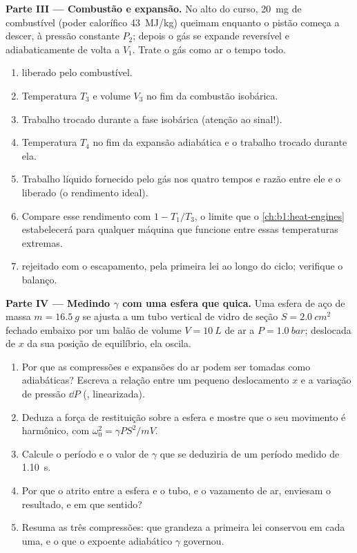 \begin{problem}
\medskip
\noindent\textbf{Parte III --- Combustão e expansão.}
No alto do curso, \qty{20}{mg} de combustível (poder calorífico
\qty{43}{MJ/kg}) queimam enquanto o pistão começa a descer, à pressão
constante $P_2$; depois o gás se expande reversível e adiabaticamente de
volta a $V_1$. Trate o gás como ar o tempo todo.
\begin{enumerate}[resume]
  \item {} liberado pelo combustível.
  \item Temperatura $T_3$ e volume $V_3$ no fim da combustão
        isobárica.
  \item Trabalho trocado durante a fase isobárica (atenção ao sinal!).
  \item Temperatura $T_4$ no fim da expansão adiabática e o trabalho
        trocado durante ela.
  \item Trabalho líquido fornecido pelo gás nos quatro tempos e razão
        entre ele e o  liberado (o rendimento ideal).
  \item Compare esse rendimento com $1 - T_1/T_3$, o limite que o
        \cref{ch:b1:heat-engines} estabelecerá para qualquer máquina que
        funcione entre essas temperaturas extremas.
  \item {} rejeitado com o escapamento, pela primeira lei ao longo do
        ciclo; verifique o balanço.
\end{enumerate}

\medskip
\noindent\textbf{Parte IV --- Medindo $\gamma$ com uma esfera que quica.}
Uma esfera de aço de massa $m = \qty{16.5}{g}$ se ajusta a um tubo vertical
de vidro de seção $S = \qty{2.0}{cm^2}$ fechado embaixo por um balão de
volume $V = \qty{10}{L}$ de ar a $P = \qty{1.0}{bar}$; deslocada de $x$ da
sua posição de equilíbrio, ela oscila.
\begin{enumerate}[resume]
  \item Por que as compressões e expansões do ar podem ser tomadas como
        adiabáticas? Escreva a relação entre um pequeno deslocamento $x$
        e a variação de pressão $\dd P$ (, linearizada).
  \item Deduza a força de restituição sobre a esfera e mostre que o seu
        movimento é harmônico, com $\omega_0^2 = \gamma PS^2/mV$.
  \item Calcule o período e o valor de $\gamma$ que se deduziria de um
        período medido de \qty{1.10}{s}.
  \item Por que o atrito entre a esfera e o tubo, e o vazamento de ar,
        enviesam o resultado, e em que sentido?
  \item Resuma as três compressões: que grandeza a primeira lei conservou
        em cada uma, e o que o expoente adiabático $\gamma$ governou.
\end{enumerate}
\end{problem}
